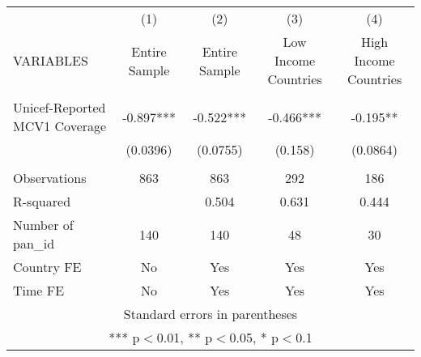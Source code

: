 \documentclass[]{article}
\begin{document}
\begin{tabular}{lcccc} \hline
 & (1) & (2) & (3) & (4) \\
VARIABLES & Entire Sample & Entire Sample & Low Income Countries & High Income Countries \\ \hline
 &  &  &  &  \\
Unicef-Reported MCV1 Coverage & -0.897*** & -0.522*** & -0.466*** & -0.195** \\
 & (0.0396) & (0.0755) & (0.158) & (0.0864) \\
 &  &  &  &  \\
Observations & 863 & 863 & 292 & 186 \\
R-squared &  & 0.504 & 0.631 & 0.444 \\
Number of pan\_id & 140 & 140 & 48 & 30 \\
Country FE & No & Yes & Yes & Yes \\
 Time FE & No & Yes & Yes & Yes \\ \hline
\multicolumn{5}{c}{ Standard errors in parentheses} \\
\multicolumn{5}{c}{ *** p$<$0.01, ** p$<$0.05, * p$<$0.1} \\
\end{tabular}
\end{document}
